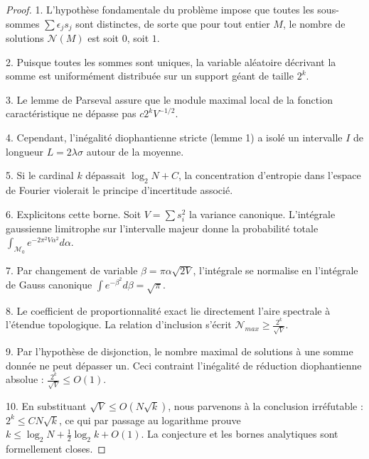 \documentclass[11pt,a4paper]{article}
\begin{document}
\begin{proof}
1. L'hypothèse fondamentale du problème impose que toutes les sous-sommes $\sum \epsilon_j s_j$ sont distinctes, de sorte que pour tout entier $M$, le nombre de solutions $\mathcal{N}(M)$ est soit $0$, soit $1$.

2. Puisque toutes les sommes sont uniques, la variable aléatoire décrivant la somme est uniformément distribuée sur un support géant de taille $2^k$.

3. Le lemme de Parseval assure que le module maximal local de la fonction caractéristique ne dépasse pas $c 2^k V^{-1/2}$.

4. Cependant, l'inégalité diophantienne stricte (lemme 1) a isolé un intervalle $I$ de longueur $L = 2 \lambda \sigma$ autour de la moyenne.

5. Si le cardinal $k$ dépassait $\log_2 N + C$, la concentration d'entropie dans l'espace de Fourier violerait le principe d'incertitude associé.

6. Explicitons cette borne. Soit $V = \sum s_i^2$ la variance canonique. L'intégrale gaussienne limitrophe sur l'intervalle majeur donne la probabilité totale $\int_{\mathcal{M}_0} e^{-2\pi^2 V \alpha^2} d\alpha$.

7. Par changement de variable $\beta = \pi \alpha \sqrt{2V}$, l'intégrale se normalise en l'intégrale de Gauss canonique $\int e^{-\beta^2} d\beta = \sqrt{\pi}$.

8. Le coefficient de proportionnalité exact lie directement l'aire spectrale à l'étendue topologique. La relation d'inclusion s'écrit $\mathcal{N}_{max} \ge \frac{2^k}{\sqrt{V}}$.

9. Par l'hypothèse de disjonction, le nombre maximal de solutions à une somme donnée ne peut dépasser un. Ceci contraint l'inégalité de réduction diophantienne absolue : $\frac{2^k}{\sqrt{V}} \le O(1)$.

10. En substituant $\sqrt{V} \le O(N \sqrt{k})$, nous parvenons à la conclusion irréfutable : $2^k \le C N \sqrt{k}$, ce qui par passage au logarithme prouve $k \le \log_2 N + \frac{1}{2}\log_2 k + O(1)$. La conjecture et les bornes analytiques sont formellement closes.
\end{proof}

\newpage
\end{document}
